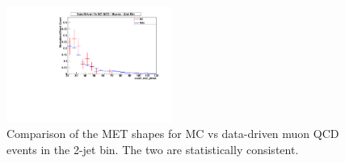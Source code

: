 \begin{figure}[h!] {\centering
{}\linewidth
\includegraphics[width=0.48\textwidth]{plots/2012_QCD/QCDDataVSMC_Muons2J_MET.pdf}
\caption{ Comparison of the MET shapes for MC vs data-driven muon QCD events in the 2-jet bin. The two are statistically consistent.} 
\label{fig:QCDCutLoosening_MET}
}
\end{figure}
